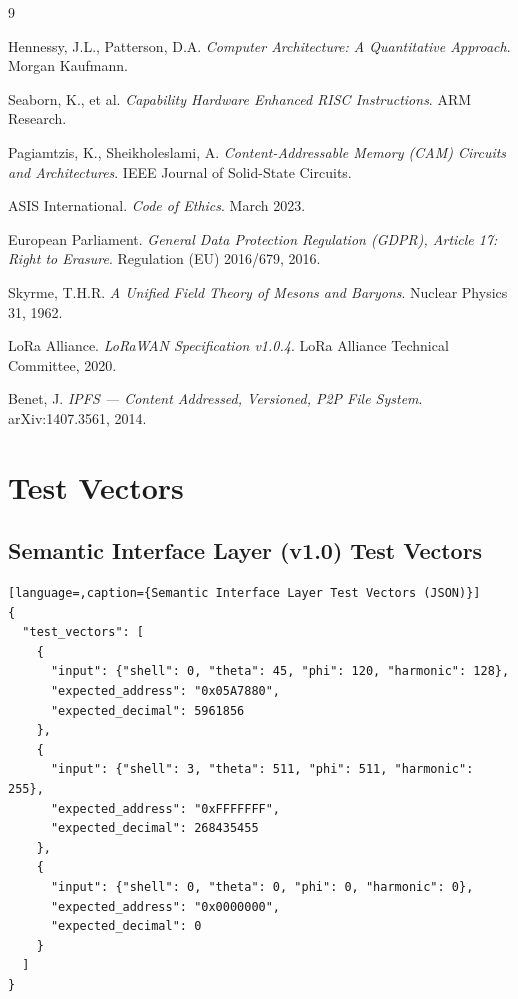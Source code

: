 \documentclass[11pt,a4paper]{article}
\begin{document}

\begin{thebibliography}{9}

Hennessy, J.L., Patterson, D.A.
\textit{Computer Architecture: A Quantitative Approach}.
Morgan Kaufmann.

Seaborn, K., et al.
\textit{Capability Hardware Enhanced RISC Instructions}.
ARM Research.

Pagiamtzis, K., Sheikholeslami, A.
\textit{Content-Addressable Memory (CAM) Circuits and Architectures}.
IEEE Journal of Solid-State Circuits.

ASIS International.
\textit{Code of Ethics}.
March 2023.

European Parliament.
\textit{General Data Protection Regulation (GDPR), Article 17: Right to Erasure}.
Regulation (EU) 2016/679, 2016.

Skyrme, T.H.R.
\textit{A Unified Field Theory of Mesons and Baryons}.
Nuclear Physics 31, 1962.

LoRa Alliance.
\textit{LoRaWAN Specification v1.0.4}.
LoRa Alliance Technical Committee, 2020.

Benet, J.
\textit{IPFS --- Content Addressed, Versioned, P2P File System}.
arXiv:1407.3561, 2014.

\end{thebibliography}

\appendix

\section{Test Vectors}

\subsection{Semantic Interface Layer (v1.0) Test Vectors}

\begin{lstlisting}[language=,caption={Semantic Interface Layer Test Vectors (JSON)}]
{
  "test_vectors": [
    {
      "input": {"shell": 0, "theta": 45, "phi": 120, "harmonic": 128},
      "expected_address": "0x05A7880",
      "expected_decimal": 5961856
    },
    {
      "input": {"shell": 3, "theta": 511, "phi": 511, "harmonic": 255},
      "expected_address": "0xFFFFFFF",
      "expected_decimal": 268435455
    },
    {
      "input": {"shell": 0, "theta": 0, "phi": 0, "harmonic": 0},
      "expected_address": "0x0000000",
      "expected_decimal": 0
    }
  ]
}
\end{lstlisting}
\end{document}
